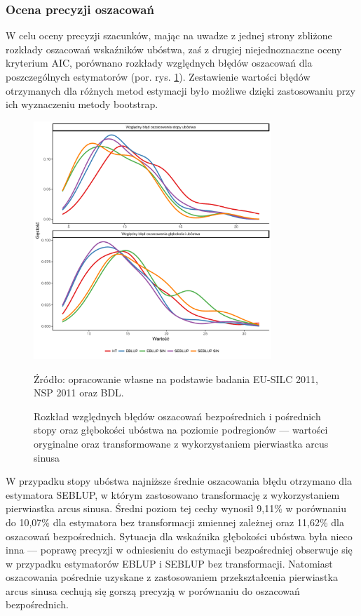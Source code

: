 \subsubsection{Ocena precyzji oszacowań}

W celu oceny precyzji szacunków, mając na uwadze z jednej strony zbliżone rozkłady oszacowań wskaźników ubóstwa, zaś z drugiej niejednoznaczne oceny kryterium AIC, porównano rozkłady względnych błędów oszacowań dla poszczególnych estymatorów (por. rys. \ref{fig:podreg_prec}). Zestawienie wartości błędów otrzymanych dla różnych metod estymacji było możliwe dzięki zastosowaniu przy ich wyznaczeniu metody bootstrap.

\begin{figure}[htp]
\centering
\includegraphics[width=0.8\textwidth]{04_wykresy/model_podreg_precyzja-1.pdf}
\caption{Rozkład względnych błędów oszacowań bezpośrednich i pośrednich stopy oraz głębokości ubóstwa na poziomie podregionów --- wartości oryginalne oraz transformowane z wykorzystaniem pierwiastka arcus sinusa}
\small{Źródło: opracowanie własne na podstawie badania EU-SILC 2011, NSP 2011 oraz BDL.}
\label{fig:podreg_prec}
\end{figure}

W przypadku stopy ubóstwa najniższe średnie oszacowania błędu otrzymano dla estymatora SEBLUP, w którym zastosowano transformację z wykorzystaniem pierwiastka arcus sinusa. Średni poziom tej cechy wynosił 9,11\% w porównaniu do 10,07\% dla estymatora bez transformacji zmiennej zależnej oraz 11,62\% dla oszacowań bezpośrednich. Sytuacja dla wskaźnika głębokości ubóstwa była nieco inna --- poprawę precyzji w odniesieniu do estymacji bezpośredniej obserwuje się w przypadku estymatorów EBLUP i SEBLUP bez transformacji. Natomiast oszacowania pośrednie uzyskane z zastosowaniem przekształcenia pierwiastka arcus sinusa cechują się gorszą precyzją w porównaniu do oszacowań bezpośrednich.

